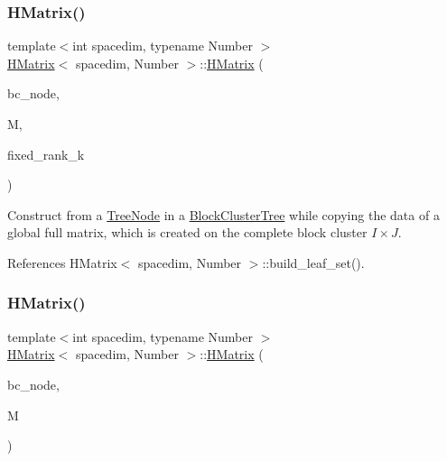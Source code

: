 \subsubsection{\texorpdfstring{H\+Matrix()}{HMatrix()}\hspace{0.1cm}{\footnotesize\ttfamily [6/11]}}
{\footnotesize\ttfamily template$<$int spacedim, typename Number $>$ \\
\hyperlink{classHMatrix}{H\+Matrix}$<$ spacedim, Number $>$\+::\hyperlink{classHMatrix}{H\+Matrix} (\begin{DoxyParamCaption}\item[{typename \hyperlink{classBlockClusterTree}{Block\+Cluster\+Tree}$<$ spacedim, Number $>$\+::node\+\_\+const\+\_\+pointer\+\_\+type}]{bc\+\_\+node,  }\item[{const \hyperlink{classLAPACKFullMatrixExt}{L\+A\+P\+A\+C\+K\+Full\+Matrix\+Ext}$<$ Number $>$ \&}]{M,  }\item[{const unsigned int}]{fixed\+\_\+rank\+\_\+k }\end{DoxyParamCaption})}

Construct from a \hyperlink{classTreeNode}{Tree\+Node} in a \hyperlink{classBlockClusterTree}{Block\+Cluster\+Tree} while copying the data of a global full matrix, which is created on the complete block cluster $I \times J$. 

References H\+Matrix$<$ spacedim, Number $>$\+::build\+\_\+leaf\+\_\+set().

\mbox{\label{classHMatrix_a97b27ea3c54897b34ccb163415d1569d}} 
\subsubsection{\texorpdfstring{H\+Matrix()}{HMatrix()}\hspace{0.1cm}{\footnotesize\ttfamily [7/11]}}
{\footnotesize\ttfamily template$<$int spacedim, typename Number $>$ \\
\hyperlink{classHMatrix}{H\+Matrix}$<$ spacedim, Number $>$\+::\hyperlink{classHMatrix}{H\+Matrix} (\begin{DoxyParamCaption}\item[{typename \hyperlink{classBlockClusterTree}{Block\+Cluster\+Tree}$<$ spacedim, Number $>$\+::node\+\_\+const\+\_\+pointer\+\_\+type}]{bc\+\_\+node,  }\item[{const \hyperlink{classLAPACKFullMatrixExt}{L\+A\+P\+A\+C\+K\+Full\+Matrix\+Ext}$<$ Number $>$ \&}]{M }\end{DoxyParamCaption})}


